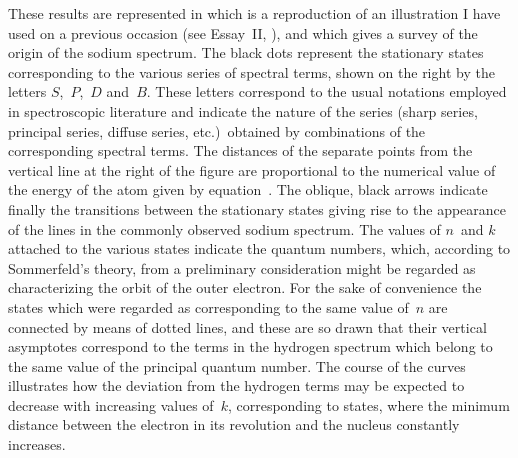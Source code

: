 These results are represented in  which is a reproduction
of an illustration I have used on a previous occasion
(see Essay~II, ), and which gives a survey of the origin
of the sodium spectrum. The black dots represent the stationary
states corresponding to the various series of spectral terms,
shown on the right by the letters $S$,~$P$,~$D$ and~$B$. These letters
correspond to the usual notations employed in spectroscopic
literature and indicate the nature of the series (sharp series,
principal series, diffuse series, etc.)\ obtained by combinations of
the corresponding spectral terms. The distances of the separate
points from the vertical line at the right of the figure are proportional
to the numerical value of the energy of the atom given
by equation~. The oblique, black arrows indicate finally the
transitions between the stationary states giving rise to the
appearance of the lines in the commonly observed sodium
spectrum. The values of $n$~and $k$ attached to the various states
indicate the quantum numbers, which, according to Sommerfeld's
theory, from a preliminary consideration might be regarded as
characterizing the orbit of the outer electron. For the sake of
convenience the states which were regarded as corresponding to
the same value of~$n$ are connected by means of dotted lines, and these
are so drawn that their vertical asymptotes correspond to the
terms in the hydrogen spectrum which belong to the same value
of the principal quantum number. The course of the curves illustrates
how the deviation from the hydrogen terms may be expected
to decrease with increasing values of~$k$, corresponding to states,
where the minimum distance between the electron in its revolution
and the nucleus constantly increases.


